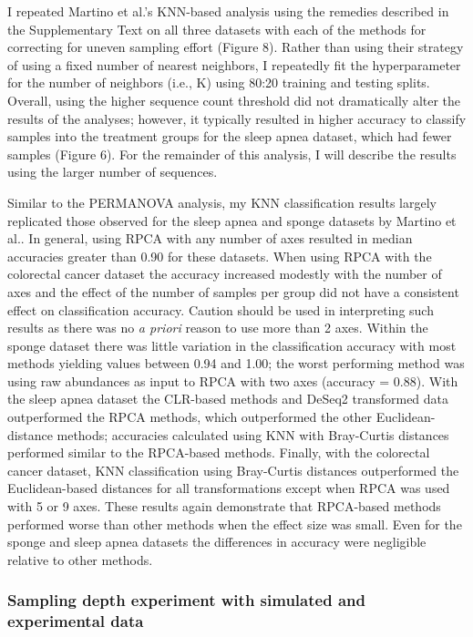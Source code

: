 \documentclass[
  11pt,
]{article}
\begin{document}
I repeated Martino et al.'s KNN-based analysis using the remedies
described in the Supplementary Text on all three datasets with each of
the methods for correcting for uneven sampling effort (Figure 8). Rather
than using their strategy of using a fixed number of nearest neighbors,
I repeatedly fit the hyperparameter for the number of neighbors (i.e.,
K) using 80:20 training and testing splits. Overall, using the higher
sequence count threshold did not dramatically alter the results of the
analyses; however, it typically resulted in higher accuracy to classify
samples into the treatment groups for the sleep apnea dataset, which had
fewer samples (Figure 6). For the remainder of this analysis, I will
describe the results using the larger number of sequences.

Similar to the PERMANOVA analysis, my KNN classification results largely
replicated those observed for the sleep apnea and sponge datasets by
Martino et al.. In general, using RPCA with any number of axes resulted
in median accuracies greater than 0.90 for these datasets. When using
RPCA with the colorectal cancer dataset the accuracy increased modestly
with the number of axes and the effect of the number of samples per
group did not have a consistent effect on classification accuracy.
Caution should be used in interpreting such results as there was no
\emph{a priori} reason to use more than 2 axes. Within the sponge
dataset there was little variation in the classification accuracy with
most methods yielding values between 0.94 and 1.00; the worst performing
method was using raw abundances as input to RPCA with two axes (accuracy
= 0.88). With the sleep apnea dataset the CLR-based methods and DeSeq2
transformed data outperformed the RPCA methods, which outperformed the
other Euclidean-distance methods; accuracies calculated using KNN with
Bray-Curtis distances performed similar to the RPCA-based methods.
Finally, with the colorectal cancer dataset, KNN classification using
Bray-Curtis distances outperformed the Euclidean-based distances for all
transformations except when RPCA was used with 5 or 9 axes. These
results again demonstrate that RPCA-based methods performed worse than
other methods when the effect size was small. Even for the sponge and
sleep apnea datasets the differences in accuracy were negligible
relative to other methods.

\subsubsection{Sampling depth experiment with simulated and experimental
data}\label{sampling-depth-experiment-with-simulated-and-experimental-data}
\end{document}
